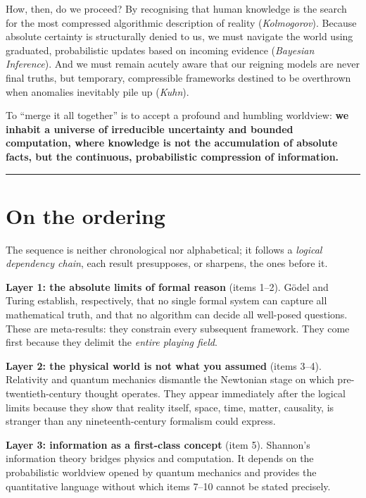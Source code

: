 \documentclass[11pt,a4paper]{article}
\begin{document}
How, then, do we proceed? By recognising that human knowledge is the search for the most compressed algorithmic description of reality (\emph{Kolmogorov}). Because absolute certainty is structurally denied to us, we must navigate the world using graduated, probabilistic updates based on incoming evidence (\emph{Bayesian Inference}). And we must remain acutely aware that our reigning models are never final truths, but temporary, compressible frameworks destined to be overthrown when anomalies inevitably pile up (\emph{Kuhn}).

To ``merge it all together'' is to accept a profound and humbling worldview: \textbf{we inhabit a universe of irreducible uncertainty and bounded computation, where knowledge is not the accumulation of absolute facts, but the continuous, probabilistic compression of information.}

\vspace{2.5em}

\begin{center}
	\color{accent}\rule{0.25\textwidth}{0.6pt}
\end{center}

\newpage

	\section*{On the ordering}
	
	The sequence is neither chronological nor alphabetical; it follows a
	\emph{logical dependency chain}, each result presupposes, or sharpens,
	the ones before it.
	
	\textbf{Layer 1: the absolute limits of formal reason} (items 1--2).
	G\"odel and Turing establish, respectively, that no single formal system
	can capture all mathematical truth, and that no algorithm can decide
	all well-posed questions. These are meta-results: they constrain every
	subsequent framework. They come first because they delimit the
	\emph{entire playing field}.
	
	\textbf{Layer 2: the physical world is not what you assumed} (items
	3--4). Relativity and quantum mechanics dismantle the Newtonian stage on
	which pre-twentieth-century thought operates. They appear immediately
	after the logical limits because they show that reality
	itself, space, time, matter, causality, is stranger than any
	nineteenth-century formalism could express.
	
	\textbf{Layer 3: information as a first-class concept} (item 5).
	Shannon's information theory bridges physics and computation. It
	depends on the probabilistic worldview opened by quantum mechanics and
	provides the quantitative language without which items 7--10 cannot be
	stated precisely.
	
\end{document}
